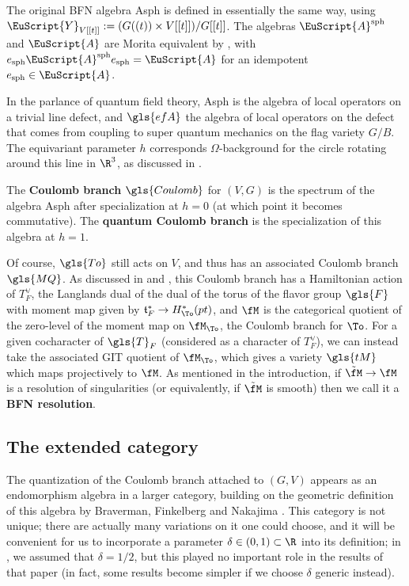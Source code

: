 The original BFN algebra \gls{Asph} is
defined in essentially the same way, using
$\EuScript{Y}_{V[[t]]}:=(G((t)) \times V[[t]])/G[[t]]$.  The algebras $\EuScript{A}^{\operatorname{sph}}$ and $\EuScript{A}$
  are Morita equivalent by \cite[Lemma 3.3]{WebSD}, with
  $e_{\operatorname{sph}}
  \EuScript{A}^{\operatorname{sph}}e_{\operatorname{sph}}=\EuScript{A}$
  for an idempotent $e_{\operatorname{sph}}\in \EuScript{A}$.
  \begin{physics}
    In the parlance of quantum field theory, \gls{Asph} is the algebra
    of local operators on a trivial line defect, and $\gls{efA}$ the
    algebra of local operators on the defect that comes from coupling
    to super quantum mechanics on the flag variety $G/B$.  The
    equivariant parameter $h$ corresponds $\Omega$-background for the circle rotating
    around this line in $\R^3$, as discussed in \cite[\S 6]{BBBDN}.
  \end{physics}


  
  
\begin{definition}
The {\bf Coulomb branch} $\gls{Coulomb}$ for $(V,G)$ is the spectrum of the algebra \gls{Asph} after specialization at $h=0$ (at which point it becomes commutative).  The {\bf quantum Coulomb branch} is the specialization of this algebra at $h=1$.
\end{definition}

Of course, $\gls{To}$ still acts on $V$, and thus has an associated Coulomb
branch $\gls{MQ}$.  As discussed in \cite[\S 3]{BFN} and \cite[\S
3.3]{WebSD}, this Coulomb branch has a Hamiltonian action of
$T_F^\vee$, the Langlands dual of the dual of the torus of the flavor
group $\gls{F}$ with moment map given by
$\mathfrak{t}_F^*\to H^*_{\To}(pt)$, and $\fM$ is the categorical
quotient of the zero-level of the moment map on $\fM_{\To}$, the
Coulomb branch for $\To$.  For a given cocharacter of $\gls{T}_F$
(considered as a character of $T_F^\vee$), we can instead take the
associated GIT quotient of $\fM_{\To}$, which gives a variety
$\gls{tM}$ which maps projectively to $\fM$.  As mentioned in the
introduction, if $\tilde{\fM}\to \fM$ is a resolution of singularities
(or equivalently, if $\tilde{\fM}$ is smooth) then we call it a {\bf
  BFN resolution}.

\subsection{The extended category}
\label{sec:extended}
The quantization of the Coulomb branch attached to $(G,V)$ appears as an endomorphism algebra in a larger category, building on the geometric definition of this algebra by Braverman, Finkelberg and Nakajima
\cite{NaCoulomb,BFN}. This category is not unique; there are actually
many variations on it one could choose, and it will be convenient for
us to incorporate a parameter $\delta\in (0,1)\subset \R$ into its
definition; in \cite{WebSD}, we assumed that $\delta=1/2$, but this
played no important role in the results of that paper (in fact, some
results become simpler if we choose $\delta$ generic instead).

